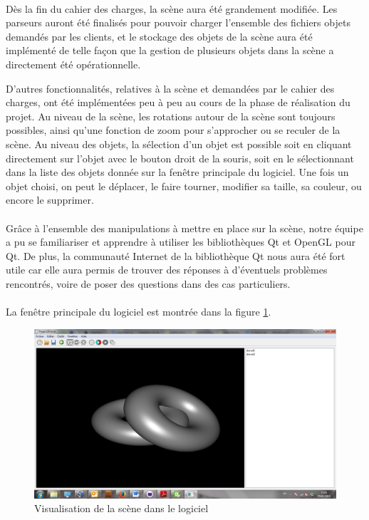 \paragraph{}
Dès la fin du cahier des charges, la scène aura été grandement modifiée. Les parseurs auront été finalisés pour pouvoir charger l'ensemble des fichiers objets demandés par les clients, et le stockage des objets de la scène aura été implémenté de telle façon que la gestion de plusieurs objets dans la scène a directement été opérationnelle. 

D'autres fonctionnalités, relatives à la scène et demandées par le cahier des charges, ont été implémentées peu à peu au cours de la phase de réalisation du projet. Au niveau de la scène, les rotations autour de la scène sont toujours possibles, ainsi qu'une fonction de zoom pour s'approcher ou se reculer de la scène. Au niveau des objets, la sélection d'un objet est possible soit en cliquant directement sur l'objet avec le bouton droit de la souris, soit en le sélectionnant dans la liste des objets donnée sur la fenêtre principale du logiciel. Une fois un objet choisi, on peut le déplacer, le faire tourner, modifier sa taille, sa couleur, ou encore le supprimer.

\paragraph{}
Grâce à l'ensemble des manipulations à mettre en place sur la scène, notre équipe a pu se familiariser et apprendre à utiliser les bibliothèques Qt et OpenGL pour Qt. De plus, la communauté Internet de la bibliothèque Qt nous aura été fort utile car elle aura permis de trouver des réponses à d'éventuels problèmes rencontrés, voire de poser des questions dans des cas particuliers.

\paragraph{}
La fenêtre principale du logiciel est montrée dans la figure \ref{fig:screenScene}.

\begin{figure}[h]
	\centering
	\includegraphics[scale=0.4]{Scene.png}
	\caption{\label{fig:screenScene} Visualisation de la scène dans le logiciel \protect}
\end{figure}

